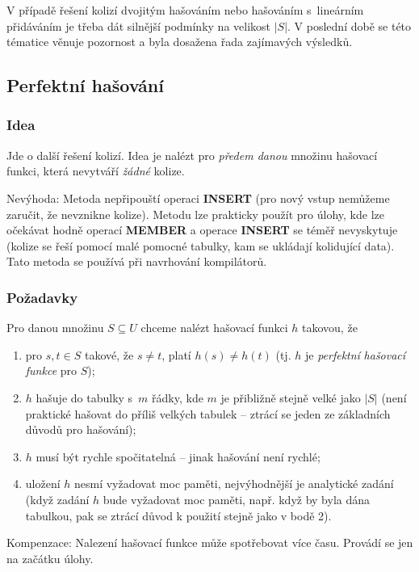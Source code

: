 \documentclass[a4paper,12pt]{article}
\begin{document}
V případě řešení 
kolizí dvojitým hašováním nebo hašováním s~lineárním přidáváním je třeba dát silnější podmínky na velikost $
|S|$. V poslední době se této tématice 
věnuje pozornost a byla dosažena řada zajímavých výsledků.

\subsection{Perfektní hašování}

\subsubsection{Idea}
Jde o další řešení kolizí. Idea 
je nalézt pro \emph{předem danou} množinu hašovací funkci, která 
nevytváří \emph{žádné} kolize.

Nevýhoda: Metoda nepřipouští operaci {\bf INSERT }
(pro nový vstup nemůžeme zaručit, že nevznikne  
kolize). Metodu lze prakticky použít pro úlohy, kde lze 
očekávat hodně operací {\bf MEMBER} a operace {\bf INSERT} se 
téměř nevyskytuje (kolize se řeší pomocí malé pomocné 
tabulky, kam se ukládají kolidují\-cí data). Tato metoda se 
používá při navrhování kompilátorů.

\subsubsection{Požadavky}
Pro danou množinu $S\subseteq 
U$ chceme 
nalézt hašo\-va\-cí funkci $h$ takovou, že
\begin{enumerate}
\item
pro $s,t\in S$ takové, že $s\ne t$, platí $h(s)\ne h(t)$ (tj. $
h$ je \emph{perfektní} \emph{hašovací} \emph{funkce} pro 
$S$); 
\item
$h$ hašuje do tabulky s~$m$ řádky, kde $m$ je přibližně 
stejně velké jako $|S|$ (není praktické hašovat do příliš 
velkých tabulek -- ztrácí se jeden ze základních 
důvodů pro hašování); 
\item
$h$ musí být rychle spočitatelná -- jinak hašování 
není rychlé;
\item
uložení $h$ nesmí vyžadovat moc paměti, 
nejvýhodnější je ana\-lytické zadání (když zadání $
h$ bude 
vyžadovat moc paměti, např. když by byla dána tabulkou, 
pak se ztrácí důvod k použití stejně jako v 
bodě 2).
\end{enumerate}

Kompenzace: Nalezení hašovací funkce 
může spotřebovat více času. Provádí se jen na 
začátku úlohy. 
\end{document}
